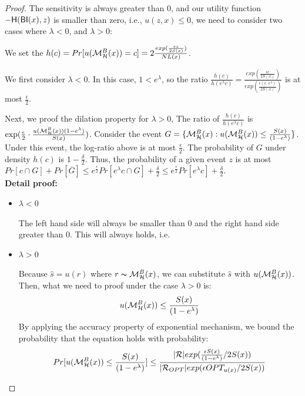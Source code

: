 \documentclass[sigconf, anonymous]{acmart}
\begin{document}
\begin{proof}

The sensitivity is always greater than 0, and our utility function $-\mathsf{H}(\mathsf{BI}(x),z)$ is smaller than zero, i.e., $u(z,x) \leq 0$, we need to consider two cases where $\lambda < 0$, and $\lambda > 0$:

We set the $h(c) = Pr[u(\mathcal{M}^{B}_{\mathcal{H}}(x)) = c] = 2\frac{exp(\frac{\epsilon z}{2 S(x)})}{NL(x)}$.

We first consider $\lambda < 0$. In this case, $1 < e ^ {\lambda}$, so the ratio $\frac{h(c)}{h(e^{\lambda}c)} = \frac{exp(\frac{\epsilon c}{2 S(x)})}{exp(\frac{\epsilon (c \cdot e^{\lambda})}{2 S(x)})}$ is at most $\frac{\epsilon}{2}$.

Next, we proof the dilation property for $\lambda > 0$, The ratio of $\frac{h(c)}{h(e^{\lambda}c)}$ is $\exp(\frac{\epsilon}{2} \cdot \frac{u(\mathcal{M}^{B}_{\mathcal{H}}(x)) (1 - e^{\lambda})}{S(x)})$. Consider the event $G = \{ \mathcal{M}^{B}_{\mathcal{H}}(x) : u(\mathcal{M}^{B}_{\mathcal{H}}(x)) \leq \frac{S(x)}{(1 - e^{\lambda})}\}$. Under this event, the log-ratio above is at most $\frac{\epsilon}{2}$. The probability of $G$ under density $h(c)$ is $1 - \frac{\delta}{2}$. Thus, the probability of a given event $z$ is at most $Pr[c \cap G] + Pr[\overline{G}] \leq e^{\frac{\epsilon}{2}} Pr[e^{\lambda}c \cap G] + \frac{\delta}{2} \leq e^{\frac{\epsilon}{2}} Pr[e^{\lambda}c] + \frac{\delta}{2}$.\\


\textbf{Detail proof:}
\begin{itemize}

	\item $\lambda < 0$

		The left hand side will always be smaller than 0 and the right hand side greater than 0. This will always holds, i.e.
		\begin{equation*}
		\end{equation*}
	\item $\lambda > 0$


Because $\hat{s} = u(r)$ where $r \thicksim \mathcal{M}^{B}_{\mathcal{H}}(x)$, we can substitute $\hat{s}$ with $u(\mathcal{M}^{B}_{\mathcal{H}}(x))$. Then, what we need to proof under the case $\lambda > 0$ is:
\begin{equation*}
u(\mathcal{M}^{B}_{\mathcal{H}}(x)) \leq \frac{S(x)}{(1 - e ^ {\lambda})}
\end{equation*}
By applying the accuracy property of exponential mechanism, we bound the probability that the equation holds with probability:
\begin{equation*}
\begin{split}
Pr[u(\mathcal{M}^{B}_{\mathcal{H}}(x)) \leq \frac{S(x)}{(1 - e ^ {\lambda})}] 
& \leq \frac{|\mathcal{R}|exp(\frac{\epsilon S(x)}{(1 - e ^ {\lambda})}/2 S(x))}{|\mathcal{R}_{OPT}| exp(\epsilon OPT_{u(x)}/2 S(x))}\\
\end{split}
\end{equation*}


\end{itemize}
\end{proof}
\end{document}
